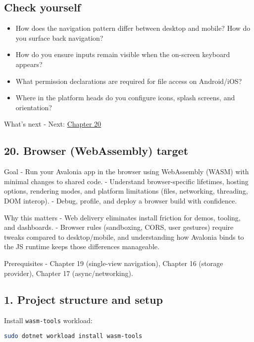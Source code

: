 \subsection{Check yourself}\label{check-yourself-17}

\begin{itemize}
\tightlist
\item
  How does the navigation pattern differ between desktop and mobile? How
  do you surface back navigation?
\item
  How do you ensure inputs remain visible when the on-screen keyboard
  appears?
\item
  What permission declarations are required for file access on
  Android/iOS?
\item
  Where in the platform heads do you configure icons, splash screens,
  and orientation?
\end{itemize}

What's next - Next: \href{Chapter20.md}{Chapter 20}

\newpage

\subsection{20. Browser (WebAssembly)
target}\label{browser-webassembly-target}

Goal - Run your Avalonia app in the browser using WebAssembly (WASM)
with minimal changes to shared code. - Understand browser-specific
lifetimes, hosting options, rendering modes, and platform limitations
(files, networking, threading, DOM interop). - Debug, profile, and
deploy a browser build with confidence.

Why this matters - Web delivery eliminates install friction for demos,
tooling, and dashboards. - Browser rules (sandboxing, CORS, user
gestures) require tweaks compared to desktop/mobile, and understanding
how Avalonia binds to the JS runtime keeps those differences manageable.

Prerequisites - Chapter 19 (single-view navigation), Chapter 16 (storage
provider), Chapter 17 (async/networking).

\subsection{1. Project structure and
setup}\label{project-structure-and-setup}

Install \passthrough{\lstinline!wasm-tools!} workload:

\begin{lstlisting}[language=bash]
sudo dotnet workload install wasm-tools
\end{lstlisting}


